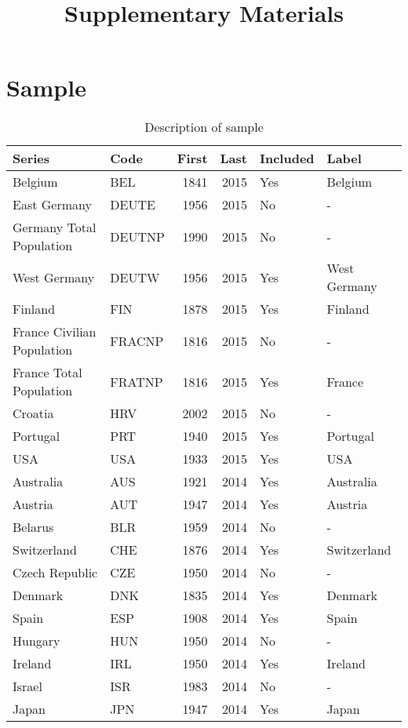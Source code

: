 \documentclass{article}\usepackage[]{graphicx}\usepackage[]{color}
\title{Supplementary Materials}
\begin{document}
\maketitle

\section{Sample}

\begin{table}[ht]
\centering
\caption{Description of sample} 
\label{tab:sample_description}
\begingroup\small
\begin{tabular}{llrrll}
  \hline
Series & Code & First & Last & Included & Label \\ 
  \hline
Belgium & BEL & 1841 & 2015 & Yes & Belgium \\ 
  East Germany & DEUTE & 1956 & 2015 & No & - \\ 
  Germany Total Population & DEUTNP & 1990 & 2015 & No & - \\ 
  West Germany & DEUTW & 1956 & 2015 & Yes & West Germany \\ 
  Finland & FIN & 1878 & 2015 & Yes & Finland \\ 
  France Civilian Population & FRACNP & 1816 & 2015 & No & - \\ 
  France Total Population & FRATNP & 1816 & 2015 & Yes & France \\ 
  Croatia & HRV & 2002 & 2015 & No & - \\ 
  Portugal & PRT & 1940 & 2015 & Yes & Portugal \\ 
  USA & USA & 1933 & 2015 & Yes & USA \\ 
  Australia & AUS & 1921 & 2014 & Yes & Australia \\ 
  Austria & AUT & 1947 & 2014 & Yes & Austria \\ 
  Belarus & BLR & 1959 & 2014 & No & - \\ 
  Switzerland & CHE & 1876 & 2014 & Yes & Switzerland \\ 
  Czech Republic & CZE & 1950 & 2014 & No & - \\ 
  Denmark & DNK & 1835 & 2014 & Yes & Denmark \\ 
  Spain & ESP & 1908 & 2014 & Yes & Spain \\ 
  Hungary & HUN & 1950 & 2014 & No & - \\ 
  Ireland & IRL & 1950 & 2014 & Yes & Ireland \\ 
  Israel & ISR & 1983 & 2014 & No & - \\ 
  Japan & JPN & 1947 & 2014 & Yes & Japan \\ 

\end{tabular}
\end{table}
\end{document}
